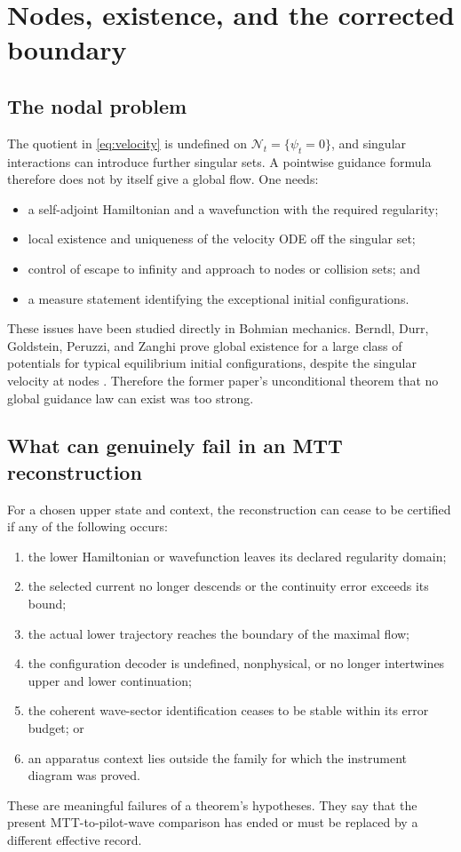 \documentclass[11pt]{article}
\theoremstyle{definition}
\theoremstyle{remark}
\newcommand{\cN}{\mathcal N}
\let\MTToriginalitem\item
\renewcommand{\item}{\par\MTToriginalitem}
\begin{document}
\section{Nodes, existence, and the corrected boundary}
\label{sec:existence}

\subsection{The nodal problem}

The quotient in \cref{eq:velocity} is undefined on
\(\cN_t=\{\psi_t=0\}\), and singular interactions can introduce further
singular sets.  A pointwise guidance formula therefore does not by itself
give a global flow.  One needs:
\begin{itemize}[leftmargin=2em]
\item a self-adjoint Hamiltonian and a wavefunction with the required
      regularity;
\item local existence and uniqueness of the velocity ODE off the singular
      set;
\item control of escape to infinity and approach to nodes or collision
      sets; and
\item a measure statement identifying the exceptional initial
      configurations.
\end{itemize}

These issues have been studied directly in Bohmian mechanics.  Berndl,
Durr, Goldstein, Peruzzi, and Zanghi prove global existence for a large
class of potentials for typical equilibrium initial configurations, despite
the singular velocity at nodes \cite{BerndlEtAl1995}.  Therefore the former
paper's unconditional theorem that no global guidance law can exist was too
strong.

\subsection{What can genuinely fail in an MTT reconstruction}

For a chosen upper state and context, the reconstruction can cease to be
certified if any of the following occurs:
\begin{enumerate}[leftmargin=2em]
\item the lower Hamiltonian or wavefunction leaves its declared regularity
      domain;
\item the selected current no longer descends or the continuity error
      exceeds its bound;
\item the actual lower trajectory reaches the boundary of the maximal flow;
\item the configuration decoder is undefined, nonphysical, or no longer
      intertwines upper and lower continuation;
\item the coherent wave-sector identification ceases to be stable within
      its error budget; or
\item an apparatus context lies outside the family for which the instrument
      diagram was proved.
\end{enumerate}
These are meaningful failures of a theorem's hypotheses.  They say that the
present MTT-to-pilot-wave comparison has ended or must be replaced by a
different effective record.
\end{document}

